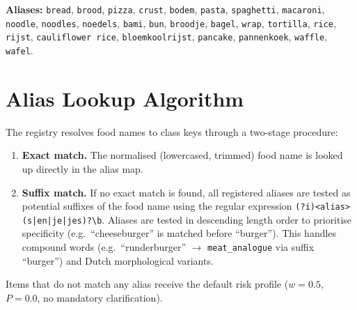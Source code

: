 \medskip
\begin{sloppypar}
\noindent\textbf{Aliases:} \texttt{bread}, \texttt{brood}, \texttt{pizza}, \texttt{crust}, \texttt{bodem}, \texttt{pasta}, \texttt{spaghetti}, \texttt{macaroni}, \texttt{noodle}, \texttt{noodles}, \texttt{noedels}, \texttt{bami}, \texttt{bun}, \texttt{broodje}, \texttt{bagel}, \texttt{wrap}, \texttt{tortilla}, \texttt{rice}, \texttt{rijst}, \texttt{cauliflower rice}, \texttt{bloemkoolrijst}, \texttt{pancake}, \texttt{pannenkoek}, \texttt{waffle}, \texttt{wafel}.
\end{sloppypar}

\section*{Alias Lookup Algorithm}

The registry resolves food names to class keys through a two-stage procedure:

\begin{enumerate}
    \item \textbf{Exact match.} The normalised (lowercased, trimmed) food name is looked up directly in the alias map.
    \item \textbf{Suffix match.} If no exact match is found, all registered aliases are tested as potential suffixes of the food name using the regular expression \texttt{(?i)<alias>(s|en|je|jes)?\textbackslash b}. Aliases are tested in descending length order to prioritise specificity (e.g.\ ``cheeseburger'' is matched before ``burger''). This handles compound words (e.g.\ ``runderburger'' $\to$ \texttt{meat\_analogue} via suffix ``burger'') and Dutch morphological variants.
\end{enumerate}

\noindent Items that do not match any alias receive the default risk profile ($w = 0.5$, $P = 0.0$, no mandatory clarification).

